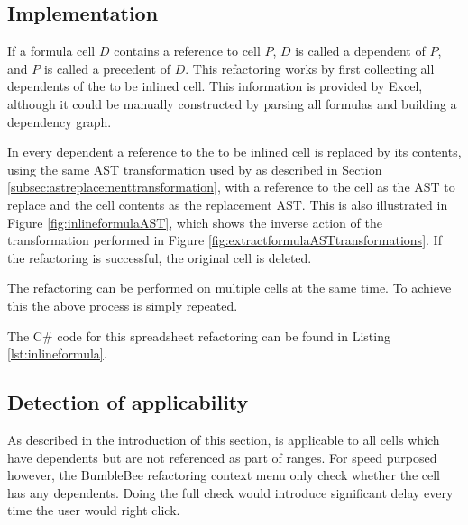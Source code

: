 \newpage

\subsection{Implementation}
\label{subsec:inlineformulaimplementation}

If a formula cell $D$ contains a reference to cell $P$, $D$ is called a dependent of $P$, and $P$ is called a precedent of $D$.
This refactoring works by first collecting all dependents of the to be inlined cell.
This information is provided by Excel, although it could be manually constructed by parsing all formulas and building a dependency graph.

In every dependent a reference to the to be inlined cell is replaced by its contents, using the same AST transformation used by  as described in Section \ref{subsec:astreplacementtransformation}, with a reference to the cell as the AST to replace and the cell contents as the replacement AST.
This is also illustrated in Figure \ref{fig:inlineformulaAST}, which shows the  inverse action of the transformation performed in Figure \ref{fig:extractformulaASTtransformations}.
If the refactoring is successful, the original cell is deleted.

The refactoring can be performed on multiple cells at the same time.
To achieve this the above process is simply repeated.

The C\# code for this spreadsheet refactoring can be found in Listing \ref{lst:inlineformula}.

\subsection{Detection of applicability}

As described in the introduction of this section,  is applicable to all cells which have dependents but are not referenced as part of ranges.
For speed purposed however, the BumbleBee refactoring context menu only check whether the cell has any dependents.
Doing the full check would introduce significant delay every time the user would right click.

\newpage

\section{}
\label{refac:introducecellname}

